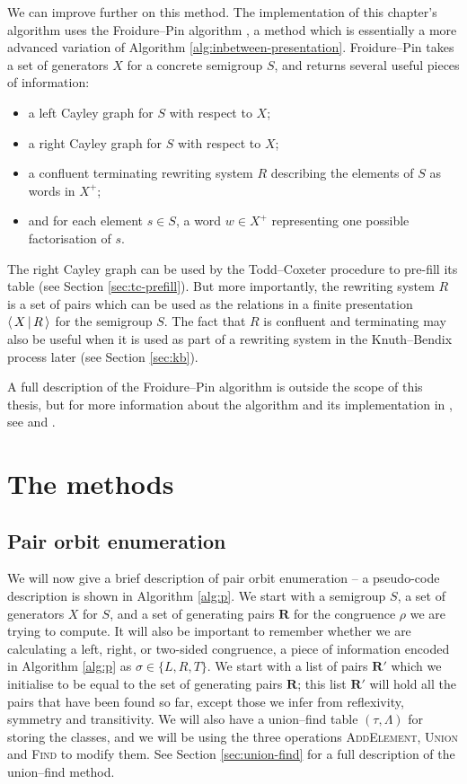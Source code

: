 We can improve further on this method.  The \libsemigroups{}
implementation of this chapter's algorithm uses the Froidure--Pin algorithm
\cite{froidure_pin}, a method which is essentially a more advanced variation of
Algorithm \ref{alg:inbetween-presentation}.  Froidure--Pin takes a set of
generators $X$ for a concrete semigroup $S$, and returns several useful pieces
of information:
\begin{itemize}
\item a left Cayley graph for $S$ with respect to $X$;
\item a right Cayley graph for $S$ with respect to $X$;
\item a confluent terminating rewriting system $R$ describing the elements of
  $S$ as words in $X^+$;
\item and for each element $s \in S$, a word $w \in X^+$ representing one
  possible factorisation of $s$.
\end{itemize}
The right Cayley graph can be used by the Todd--Coxeter procedure to pre-fill its
table (see Section \ref{sec:tc-prefill}).  But more importantly, the rewriting
system $R$ is a set of pairs which can be used as the relations in a finite
presentation $\left\langle\,X\,\middle|\,R\,\right\rangle$ for the semigroup $S$.  The fact that $R$ is confluent
and terminating may also be useful when it is used as part of a rewriting system
in the Knuth--Bendix process later (see Section \ref{sec:kb}).

A full description of the Froidure--Pin algorithm is outside the scope of this
thesis, but for more information about the algorithm and its implementation in
\libsemigroups{}, see \cite{froidure_pin_jonusas} and \cite{froidure_pin}.

\section{The methods}

\subsection{Pair orbit enumeration}
\label{sec:p}

We will now give a brief description of pair orbit enumeration -- a pseudo-code
description is shown in Algorithm \ref{alg:p}.  We start with a semigroup $S$, a
set of generators $X$ for $S$, and a set of generating pairs $\mathbf{R}$ for
the congruence $\rho$ we are trying to compute.  It will also be important to
remember whether we are calculating a left, right, or two-sided congruence, a
piece of information encoded in Algorithm \ref{alg:p} as $\sigma \in \{L,R,T\}$.
We start with a list of pairs $\mathbf{R}'$ which we initialise to be equal to
the set of generating pairs $\mathbf{R}$; this list $\mathbf{R}'$ will hold all
the pairs that have been found so far, except those we infer from reflexivity,
symmetry and transitivity.  We will also have a union--find table
$(\tau,\Lambda)$ for storing the classes, and we will be using the three
operations \textsc{AddElement}, \textsc{Union} and \textsc{Find} to modify them.
See Section \ref{sec:union-find} for a full description of the union--find
method.

